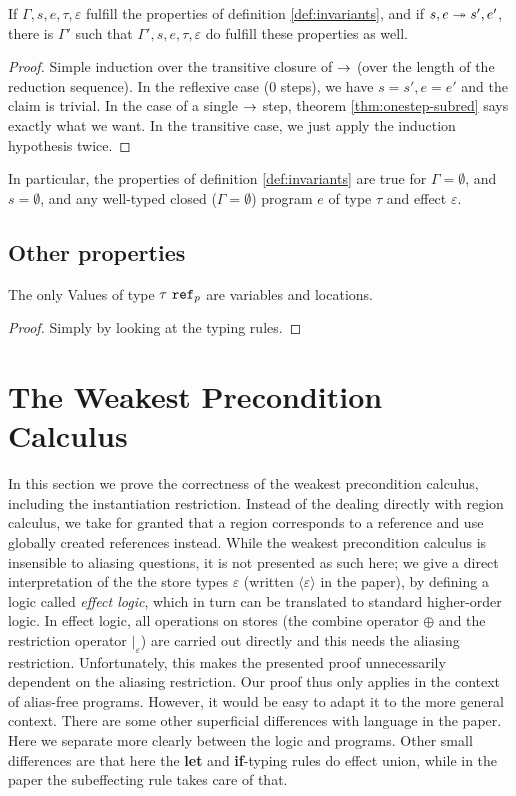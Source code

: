 \documentclass[a4paper]{article}
\begin{document}
\begin{thm}
  If $\Gamma,s,e, \tau,\varepsilon$ fulfill the properties of definition \ref{def:invariants},
  and if $s,e \twoheadrightarrow  s',e'$, there is $\Gamma'$  such that $\Gamma',s,e,\tau,\varepsilon$ do
  fulfill these properties as well.
  \label{thm:generalsubred}
\end{thm}
\begin{proof}
  Simple induction over the transitive closure of $\rightarrow $ (over the length
  of the reduction sequence). In the reflexive
  case (0 steps), we have $s = s', e = e'$ and the claim is trivial. In the
  case of a single $\rightarrow $ step, theorem \ref{thm:onestep-subred} says
  exactly what we want. In the transitive case, we just apply the induction
  hypothesis twice.
\end{proof}

In particular, the properties of definition \ref{def:invariants} are true for
$\Gamma = \emptyset$, and $s = \emptyset$, and any well-typed closed
($\Gamma = \emptyset$) program $e$ of type $\tau$ and effect $\varepsilon$.

\subsection{Other properties}

\begin{lem}[Values]
  The only Values of type ${\normalfont \tau\ \texttt{ref}_{p}}$ are variables and locations.
  \label{lem:valueprops}
\end{lem}
\begin{proof}
  Simply by looking at the typing rules.
\end{proof}


\section{The Weakest Precondition Calculus}

In this section we prove the correctness of the weakest precondition calculus,
including the instantiation restriction. Instead of the dealing directly with
region calculus, we take for granted that a region corresponds to a reference
and use globally created references instead. While the weakest precondition
calculus is insensible to aliasing questions, it is not presented as such
here; we give a direct interpretation of the the store types $ε$ (written
$\langle ε \rangle$ in the paper), by defining a logic called {\em effect
logic}, which in turn can be translated to standard higher-order logic. In
effect logic, all operations on stores (the combine operator $\oplus$ and the
restriction operator $|_ε$) are carried out directly and this needs the
aliasing restriction. Unfortunately, this makes the presented proof
unnecessarily dependent on the aliasing restriction.  Our proof thus only
applies in the context of alias-free programs. However, it would be easy to
adapt it to the more general context. There are some other superficial
differences with language in the paper. Here we separate more clearly between
the logic and programs.  Other small differences are that here the {\bf let}
and {\bf if}-typing rules do effect union, while in the paper the subeffecting
rule takes care of that.
\end{document}
